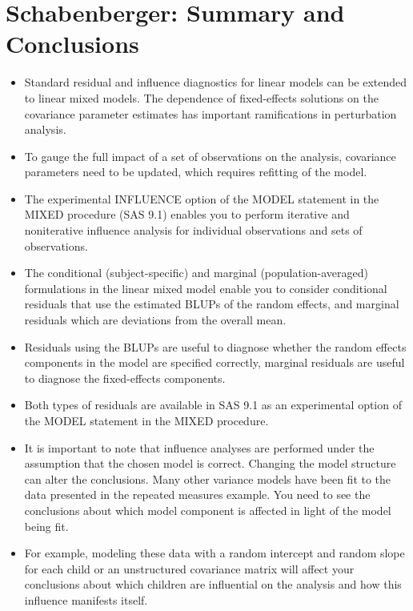 \documentclass[Main.tex]{subfiles}
\begin{document}
	\section*{Schabenberger: Summary and Conclusions}
	\begin{itemize}
		\item Standard residual and inﬂuence diagnostics for linear models can be extended to linear mixed models. The dependence of ﬁxed-effects solutions on the covariance parameter estimates has important ramiﬁcations in perturbation analysis. 
		\item To gauge the full impact of a set of observations on the analysis, covariance parameters need to be updated, which requires reﬁtting of the model. 
		\item The experimental INFLUENCE option of the MODEL statement in the MIXED procedure (SAS 9.1) enables you to perform iterative and noniterative inﬂuence analysis for individual observations and sets of observations.
		
		\item The conditional (subject-speciﬁc) and marginal (population-averaged) formulations in the linear mixed model enable you to consider conditional residuals that use the estimated BLUPs of the random effects, and marginal residuals which are deviations from the overall mean. 
		\item Residuals using the BLUPs are useful to diagnose whether the random effects components in the model are speciﬁed correctly, marginal residuals are useful to diagnose the ﬁxed-effects components. 
		\item Both types of residuals are available in SAS 9.1 as an experimental option of the MODEL statement in the MIXED procedure.
		
		\item It is important to note that influence analyses are performed under the assumption that the chosen model is correct. Changing the model structure can alter the conclusions. Many other variance models have been ﬁt to the data presented in the repeated measures example. You need to see the conclusions about which model component is affected in light of the model being fit.
		\item  For example, modeling these data with a random intercept and random slope for each child or an unstructured covariance matrix will affect your conclusions about which children are inﬂuential on the analysis and how this influence manifests itself.
	\end{itemize}
\end{document}
